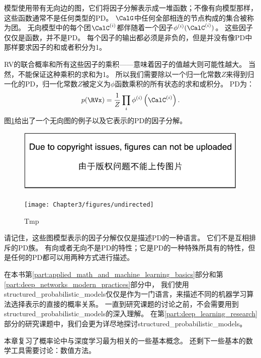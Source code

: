 
模型使用带有无向边的图，它们将因子分解表示成一堆函数；不像有向模型那样，这些函数通常不是任何类型的\gls{PD}。
$\CalG$中任何全部相连的节点构成的集合被称为团。
无向模型中的每个团$\CalC^{(i)}$都伴随着一个因子$\phi^{(i)}(\CalC^{(i)})$。
 这些因子仅仅是函数，并不是\gls{PD}。
 每个因子的输出都必须是非负的，但是并没有像\gls{PD}中那样要求因子的和或者积分为1。

\gls{RV}的联合概率和所有这些因子的乘积——意味着因子的值越大则可能性越大。
当然，不能保证这种乘积的求和为1。
所以我们需要除以一个归一化常数$Z$来得到归一化的\gls{PD}，归一化常数$Z$被定义为$\phi$函数乘积的所有状态的求和或积分。
\gls{PD}为：
\begin{equation}
p(\RVx) = \frac{1}{Z} \prod_i \phi^{(i)} \left (\CalC^{(i)} \right).
\end{equation}
图\ref{fig:chap3_undirected}给出了一个无向图的例子以及它表示的\gls{PD}的因子分解。
\begin{figure}[!htb]
\ifOpenSource
\centerline{\includegraphics{figure.pdf}}
\else
\centerline{\texttt{[image: Chapter3/figures/undirected]}}
\fi
\caption{Tmp}
\label{fig:chap3_undirected}
\end{figure}



请记住，这些图模型表示的因子分解仅仅是描述\gls{PD}的一种语言。
它们不是互相排斥的\gls{PD}族。
有向或者无向不是\gls{PD}的特性；它是\gls{PD}的一种特殊所具有的特性，但是任何的\gls{PD}都可以用两种方式进行描述。

在本书第\ref{part:applied_math_and_machine_learning_basics}部分和第\ref{part:deep_networks_modern_practices}部分中， 我们使用\gls{structured_probabilistic_models}仅仅是作为一门语言，来描述不同的机器学习算法选择表示的直接的概率关系。
一直到研究课题的讨论之前，不会需要用到\gls{structured_probabilistic_models}的深入理解。
在第\ref{part:deep_learning_research}部分的研究课题中，我们会更为详尽地探讨\gls{structured_probabilistic_models}。

本章复习了概率论中与深度学习最为相关的一些基本概念。
还剩下一些基本的数学工具需要讨论：数值方法。

